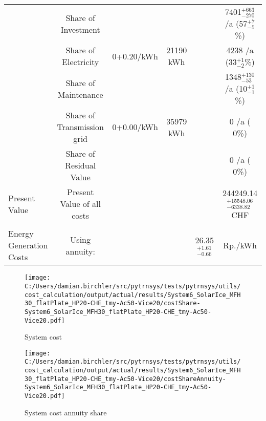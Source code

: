 \documentclass[english]{SPFShortReport}
\begin{document}
\begin{table}[!ht]
\begin{adjustbox}{max width =\textwidth}
\begin{tabular}{l | c c c c c }
 & Share of Investment & &&& 7401$^{\mathrm{+663}}_{\mathrm{-270}}$ /a (57$^{\mathrm{+ 7}}_{\mathrm{- 5}}$\%) \\
 & Share of Electricity & 0+0.20/kWh & 21190 kWh &  & 4238 /a (33$^{\mathrm{+ 1}}_{\mathrm{- 2}}$\%)\\
 & Share of Maintenance & &&& 1348$^{\mathrm{+130}}_{\mathrm{-53}}$ /a (10$^{\mathrm{+ 1}}_{\mathrm{- 1}}$\%)\\ 
 & Share of Transmission grid & 0+0.00/kWh & 35979 kWh & &  0 /a ( 0\%)\\
 & Share of Residual Value &&& &  0 /a ( 0\%)\\
Present Value  & Present Value of all costs  & &&& 244249.14$^{\mathrm{+15548.06}}_{\mathrm{-6338.82}}$ CHF \\
\hline \\ 
 Energy Generation Costs & Using annuity: &&& 26.35$^{\mathrm{+1.61}}_{\mathrm{-0.66}}$ & Rp./kWh \\
\hline
\hline
\end{tabular}
\end{adjustbox}
\label{CostsTable}
\end{table}
\begin{figure}[!htbp]
\begin{center}
\texttt{[image: C:/Users/damian.birchler/src/pytrnsys/tests/pytrnsys/utils/cost\_calculation/output/actual/results/System6\_SolarIce\_MFH30\_flatPlate\_HP20-CHE\_tmy-Ac50-Vice20/costShare-System6\_SolarIce\_MFH30\_flatPlate\_HP20-CHE\_tmy-Ac50-Vice20.pdf]}
\caption{System cost}
\label{systemCost}
\end{center}
\end{figure}
\begin{figure}[!htbp]
\begin{center}
\texttt{[image: C:/Users/damian.birchler/src/pytrnsys/tests/pytrnsys/utils/cost\_calculation/output/actual/results/System6\_SolarIce\_MFH30\_flatPlate\_HP20-CHE\_tmy-Ac50-Vice20/costShareAnnuity-System6\_SolarIce\_MFH30\_flatPlate\_HP20-CHE\_tmy-Ac50-Vice20.pdf]}
\caption{System cost annuity share}
\label{systemCostannuity}
\end{center}
\end{figure}
\end{document}
